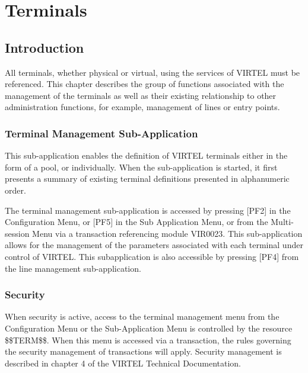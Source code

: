 \documentclass[letterpaper,10pt,english]{sphinxmanual}
\begin{document}

\chapter{Terminals}
\label{\detokenize{connectivity_guide:index-94}}\label{\detokenize{connectivity_guide:terminals}}

\section{Introduction}
\label{\detokenize{connectivity_guide:id48}}
All terminals, whether physical or virtual, using the services of VIRTEL must be referenced. This chapter describes the group of functions associated with the management of the terminals as well as their existing relationship to other administration functions, for example, management of lines or entry points.


\subsection{Terminal Management Sub-Application}
\label{\detokenize{connectivity_guide:index-95}}\label{\detokenize{connectivity_guide:terminal-management-sub-application}}
This sub-application enables the definition of VIRTEL terminals either in the form of a pool, or individually. When the sub-application is started, it first presents a summary of existing terminal definitions presented in alphanumeric order.

The terminal management sub-application is accessed by pressing {[}PF2{]} in the Configuration Menu, or {[}PF5{]} in the Sub Application Menu, or from the Multi-session Menu via a transaction referencing module VIR0023. This sub-application allows for the management of the parameters associated with each terminal under control of VIRTEL. This subapplication
is also accessible by pressing {[}PF4{]} from the line management sub-application.


\subsection{Security}
\label{\detokenize{connectivity_guide:index-96}}\label{\detokenize{connectivity_guide:id49}}
When security is active, access to the terminal management menu from the Configuration Menu or the Sub-Application Menu is controlled by the resource \$\$TERM\$\$. When this menu is accessed via a transaction, the rules governing the security management of transactions will apply. Security management is described in chapter 4 of the VIRTEL Technical Documentation.
\end{document}
